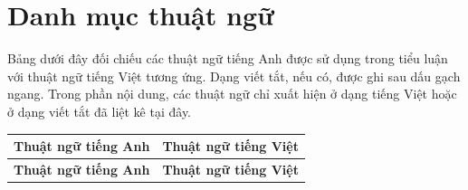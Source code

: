 \chapter*{Danh mục thuật ngữ}
\label{chap:thuat-ngu}

Bảng dưới đây đối chiếu các thuật ngữ tiếng Anh được sử dụng trong tiểu
luận với thuật ngữ tiếng Việt tương ứng. Dạng viết tắt, nếu có, được ghi
sau dấu gạch ngang. Trong phần nội dung, các thuật ngữ chỉ xuất hiện ở
dạng tiếng Việt hoặc ở dạng viết tắt đã liệt kê tại đây.

\begin{longtable}{p{7.1cm}p{7.1cm}}
\toprule
\textbf{Thuật ngữ tiếng Anh} & \textbf{Thuật ngữ tiếng Việt} \\
\midrule
\endfirsthead
\toprule
\textbf{Thuật ngữ tiếng Anh} & \textbf{Thuật ngữ tiếng Việt} \\
\midrule
\endhead


\end{longtable}

